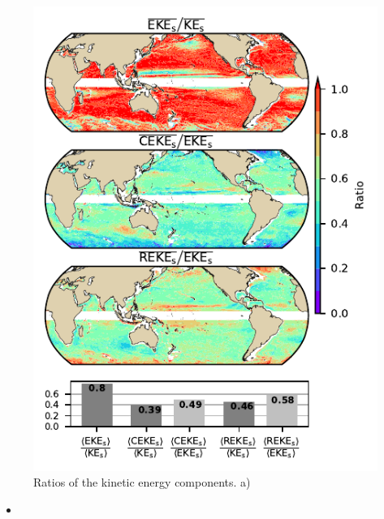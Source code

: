 \documentclass[draft]{agujournal2019}
\begin{document}
	\begin{figure}
	    \centering
	    \includegraphics[width=1\textwidth]{figures/eke_ratio_map_all.pdf}
	    \caption{Ratios of the kinetic energy components. a) }
	    \label{fig:my_label}
	\end{figure}
	
    \begin{itemize}
		\item 
	\end{itemize}
	
\end{document}
